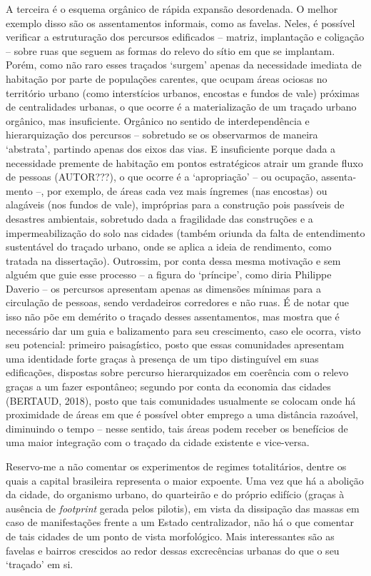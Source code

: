 \documentclass[twoside, 12pt, english,italian,latin,greek,french,spanish,brazil]{book}
\begin{document}
        A terceira é o esquema orgânico de rápida expansão desordenada. O melhor exemplo disso são os assentamentos informais, como as favelas. Neles, é possível verificar a estruturação dos percursos edificados – matriz, implantação e coligação – sobre ruas que seguem as formas do relevo do sítio em que se implantam. Porém, como não raro esses traçados ‘surgem’ apenas da necessidade imediata de habitação por parte de populações carentes, que ocupam áreas ociosas no território urbano (como interstícios urbanos, encostas e fundos de vale) próximas de centralidades urbanas,  o que ocorre é a materialização de um traçado urbano orgânico, mas insuficiente. Orgânico no sentido de interdependência e hierarquização dos percursos – sobretudo se os observarmos de maneira ‘abstrata’, partindo apenas dos eixos das vias. E insuficiente porque dada a necessidade premente de habitação em pontos estratégicos atrair um grande fluxo de pessoas (AUTOR???), o que ocorre é a ‘apropriação’ – ou ocupação, assenta-mento –, por exemplo, de áreas cada vez mais íngremes (nas encostas) ou alagáveis (nos fundos de vale), impróprias para a construção pois passíveis de desastres ambientais, sobretudo dada a fragilidade das construções e a impermeabilização do solo nas cidades (também oriunda da falta de entendimento sustentável do traçado urbano, onde se aplica a ideia de rendimento, como tratada na dissertação). Outrossim, por conta dessa mesma motivação e sem alguém que guie esse processo – a figura do ‘príncipe’, como diria Philippe Daverio – os percursos apresentam apenas as dimensões mínimas para a circulação de pessoas, sendo verdadeiros corredores e não ruas. É de notar que isso não põe em demérito o traçado desses assentamentos, mas mostra que é necessário dar um guia e balizamento para seu crescimento, caso ele ocorra, visto seu potencial: primeiro paisagístico, posto que essas comunidades apresentam uma identidade forte graças à presença de um tipo distinguível em suas edificações,  dispostas sobre percurso hierarquizados em coerência com o relevo graças a um fazer espontâneo; segundo por conta da economia das cidades (BERTAUD, 2018), posto que tais comunidades usualmente se colocam onde há proximidade de áreas em que é possível obter emprego a uma distância razoável, diminuindo o tempo – nesse sentido, tais áreas podem receber os benefícios de uma maior integração com o traçado da cidade existente e vice-versa.

        Reservo-me a não comentar os experimentos de regimes totalitários, dentre os quais a capital brasileira representa o maior expoente. Uma vez que há a abolição da cidade, do organismo urbano, do quarteirão e do próprio edifício (graças à ausência de \textit{footprint} gerada pelos pilotis), em vista da dissipação das massas em caso de manifestações frente a um Estado centralizador, não há o que comentar de tais cidades de um ponto de vista morfológico. Mais interessantes são as favelas e bairros crescidos ao redor dessas excrecências urbanas do que o seu ‘traçado’ em si.
\end{document}
